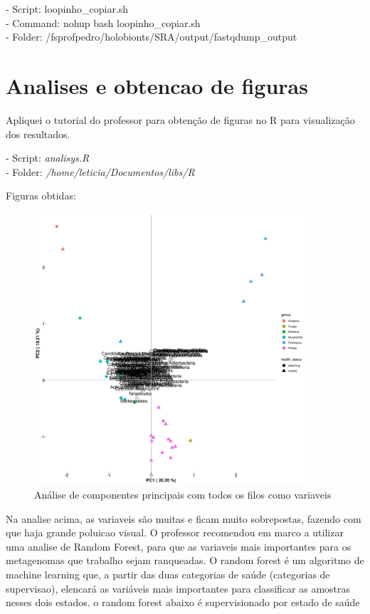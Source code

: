 \documentclass[12pt, a4paper]{report}
\begin{document}
\begin{tcolorbox}[width=6.3in]
	- Script: loopinho\_copiar.sh\\
	- Command: nohup bash loopinho\_copiar.sh\\
	- Folder: /fsprofpedro/holobionts/SRA/output/fastqdump\_output
\end{tcolorbox}



\newpage
\section{Analises e obtencao de figuras}
Apliquei o tutorial do professor para obtenção de figuras no R para visualização dos resultados. \\
\begin{tcolorbox}[width=6.3in]
- Script: \textit{analisys.R}\\
- Folder: \textit{/home/leticia/Documentos/libs/R}
\end{tcolorbox}

Figuras obtidas:

\begin{figure}[!h]
  \centering 
  \includegraphics[width=0.9\textwidth]{figures/output_PCA_corais_2018_10_01.jpg}
  \caption{Análise de componentes principais com todos os filos como variaveis}
  \end{figure}

Na analise acima, as variaveis são muitas e ficam muito sobrepostas, fazendo com que haja grande poluicao visual. O professor recomendou em marco a utilizar uma analise de Random Forest, para que as variaveis mais importantes para os metagenomas que trabalho sejam ranqueadas. O random forest é um algoritmo de machine learning que, a partir das duas categorias de saúde (categorias de supervisao), elencará as variáveis mais importantes para classificar as amostras nesses dois estados. o random forest abaixo é supervisionado por estado de saúde \\
\end{document}
